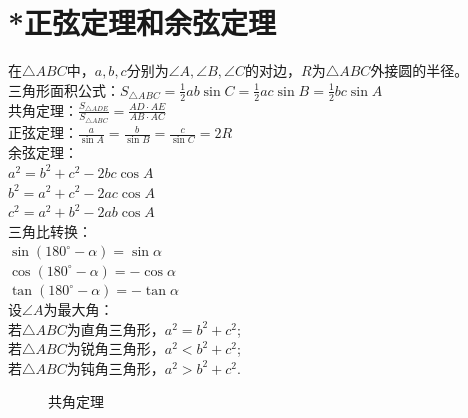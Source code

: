 \section{*正弦定理和余弦定理}
\begin{theorem}
    在$\triangle ABC$中，$a,b,c$分别为$\angle A,\angle B,\angle C$的对边，$R$为$\triangle ABC$外接圆的半径。 \\
    三角形面积公式：$S_{\triangle ABC}=\frac{1}{2}ab\sin C=\frac{1}{2}ac\sin B=\frac{1}{2}bc\sin A$ \\
    共角定理：$\frac{S_{\triangle ADE}}{S_{\triangle ABC}}=\frac{AD·AE}{AB·AC}$ \\
    正弦定理：$\frac{a}{\sin A}=\frac{b}{\sin B}=\frac{c}{\sin C}=2R$ \\
    余弦定理：\\
    $a^2=b^2+c^2-2bc\cos A$ \\
    $b^2=a^2+c^2-2ac\cos A$ \\
    $c^2=a^2+b^2-2ab\cos A$ \\
    三角比转换：\\
    $\sin(180^\circ - \alpha)=\sin \alpha$ \\
    $\cos(180^\circ - \alpha)=-\cos \alpha$ \\
    $\tan(180^\circ - \alpha)=-\tan \alpha$ \\
    设$\angle A$为最大角：\\
    若$\triangle ABC$为直角三角形，$a^2=b^2+c^2$; \\
    若$\triangle ABC$为锐角三角形，$a^2<b^2+c^2$; \\
    若$\triangle ABC$为钝角三角形，$a^2>b^2+c^2$. \\
\end{theorem}
\begin{figure}[H]
    \centering
    \resizebox{4cm}{!}{}
    \caption{共角定理}
\end{figure}
\clearpage
